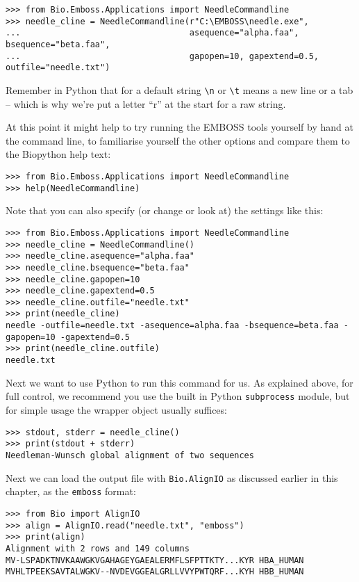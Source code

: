 \begin{verbatim}
>>> from Bio.Emboss.Applications import NeedleCommandline
>>> needle_cline = NeedleCommandline(r"C:\EMBOSS\needle.exe",
...                                  asequence="alpha.faa", bsequence="beta.faa",
...                                  gapopen=10, gapextend=0.5, outfile="needle.txt")
\end{verbatim}

\noindent Remember in Python that for a default string \verb|\n| or \verb|\t| means a
new line or a tab -- which is why we're put a letter ``r'' at the start for a raw string.

At this point it might help to try running the EMBOSS tools yourself by hand at the
command line, to familiarise yourself the other options and compare them to the
Biopython help text:

\begin{verbatim}
>>> from Bio.Emboss.Applications import NeedleCommandline
>>> help(NeedleCommandline)
\end{verbatim}

Note that you can also specify (or change or look at) the settings like this:

\begin{verbatim}
>>> from Bio.Emboss.Applications import NeedleCommandline
>>> needle_cline = NeedleCommandline()
>>> needle_cline.asequence="alpha.faa"
>>> needle_cline.bsequence="beta.faa"
>>> needle_cline.gapopen=10
>>> needle_cline.gapextend=0.5
>>> needle_cline.outfile="needle.txt"
>>> print(needle_cline)
needle -outfile=needle.txt -asequence=alpha.faa -bsequence=beta.faa -gapopen=10 -gapextend=0.5
>>> print(needle_cline.outfile)
needle.txt
\end{verbatim}

Next we want to use Python to run this command for us. As explained above,
for full control, we recommend you use the built in Python \texttt{subprocess}
module, but for simple usage the wrapper object usually suffices:

\begin{verbatim}
>>> stdout, stderr = needle_cline()
>>> print(stdout + stderr)
Needleman-Wunsch global alignment of two sequences
\end{verbatim}

Next we can load the output file with \verb|Bio.AlignIO| as
discussed earlier in this chapter, as the \texttt{emboss} format:

\begin{verbatim}
>>> from Bio import AlignIO
>>> align = AlignIO.read("needle.txt", "emboss")
>>> print(align)
Alignment with 2 rows and 149 columns
MV-LSPADKTNVKAAWGKVGAHAGEYGAEALERMFLSFPTTKTY...KYR HBA_HUMAN
MVHLTPEEKSAVTALWGKV--NVDEVGGEALGRLLVVYPWTQRF...KYH HBB_HUMAN
\end{verbatim}

